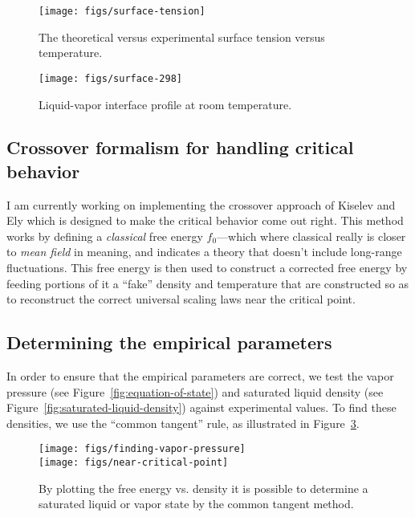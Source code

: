 \documentclass[letterpaper,twocolumn,amsmath,amssymb,prb]{revtex4-1}
\begin{document}
\begin{figure}
\begin{center}
\texttt{[image: figs/surface-tension]}
\end{center}
\caption{The theoretical versus experimental surface tension
  versus temperature.  }
\label{fig:surface-tension}
\end{figure}

\begin{figure}
\begin{center}
\texttt{[image: figs/surface-298]}
\end{center}
\caption{Liquid-vapor interface profile at room temperature.  }
\label{fig:liquid-vapor-profile}
\end{figure}

\subsection{Crossover formalism for handling critical behavior}

I am currently working on implementing the crossover approach of
Kiselev and Ely which is designed to make the critical behavior come
out right\cite{kiselev2006new}.  This method works by defining a
\emph{classical} free energy $f_0$---which where classical really is
closer to \emph{mean field} in meaning, and indicates a theory that
doesn't include long-range fluctuations.  This free energy is then
used to construct a corrected free energy by feeding portions of it a
``fake'' density and temperature that are constructed so as to
reconstruct the correct universal scaling laws near the critical
point.

\subsection{Determining the empirical parameters}\label{sec:empirical}

In order to ensure that the empirical parameters are correct, we test
the vapor pressure (see Figure~\ref{fig:equation-of-state}) and
saturated liquid density (see
Figure~\ref{fig:saturated-liquid-density}) against experimental
values.  To find these densities, we use the ``common tangent'' rule,
as illustrated in Figure~\ref{fig:homogeneous}.

\begin{figure}
\begin{center}
\texttt{[image: figs/finding-vapor-pressure]}\\
\texttt{[image: figs/near-critical-point]}
\end{center}
\caption{By plotting the free energy vs. density it is possible to
  determine a saturated liquid or vapor state by the common tangent
  method.  }
\label{fig:homogeneous}
\end{figure}
\end{document}
